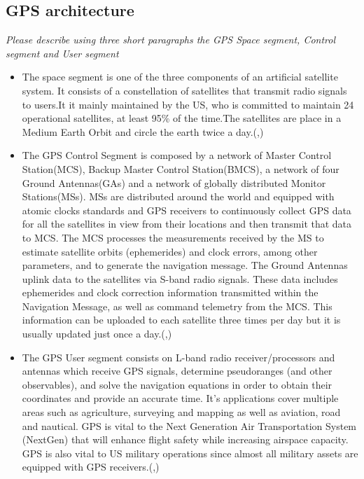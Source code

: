 \documentclass[paper=letter, fontsize=10pt]{article}
\begin{document}
\subsection{GPS architecture}
\emph{Please describe using three short paragraphs the GPS Space segment, Control segment and User segment}
\begin{itemize}
\item The space segment is one of the three components of an artificial satellite system. It consists of a constellation of satellites that transmit radio signals to users.It it mainly maintained by the US, who is committed to maintain 24 operational satellites, at least 95\% of the time.The satellites are place in a Medium Earth Orbit and circle the earth twice a day.(\cite{navipedia},\cite{gps_gov})

\item The GPS Control Segment is composed by a network of Master Control Station(MCS), Backup Master Control Station(BMCS), a network of four Ground Antennas(GAs) and a network of globally distributed Monitor Stations(MSs). MSs are distributed around the world and equipped with atomic clocks standards and GPS receivers to continuously collect GPS data for all the satellites in view from their locations and then transmit that data to MCS. The MCS processes the measurements received by the MS to estimate satellite orbits (ephemerides) and clock errors, among other parameters, and to generate the navigation message. The Ground Antennas uplink data to the satellites via S-band radio signals. These data includes ephemerides and clock correction information transmitted within the Navigation Message, as well as command telemetry from the MCS. This information can be uploaded to each satellite three times per day but it is usually updated just once a day.(\cite{navipedia},\cite{gps_gov})
\item The GPS User segment consists on L-band radio receiver/processors and antennas which receive GPS signals, determine pseudoranges (and other observables), and solve the navigation equations in order to obtain their coordinates and provide an accurate time. It's applications cover multiple areas such as agriculture, surveying and mapping as well as aviation, road and nautical. GPS is vital to the Next Generation Air Transportation System (NextGen) that will enhance flight safety while increasing airspace capacity. GPS is also vital to US military operations since almost all military assets are equipped with GPS receivers.(\cite{navipedia},\cite{gps_gov})
\end{itemize}
\end{document}

